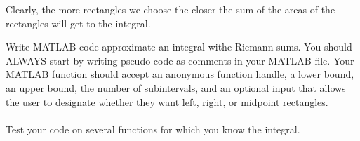 Clearly, the more rectangles we choose the closer the sum of the areas of the rectangles will get to the integral.
\begin{problem}
    Write MATLAB code approximate an integral withe Riemann sums. You should ALWAYS start by writing pseudo-code as comments in your
    MATLAB file.    Your MATLAB function
    should accept an anonymous function handle, a lower bound, an upper bound, the number
    of subintervals, and an optional input that allows the user to designate whether they
    want left, right, or midpoint rectangles. \\
     \\
    Test your code on several functions for which you know the integral.
\end{problem}

